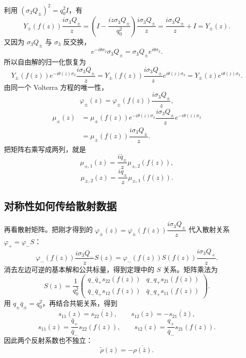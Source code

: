 \documentclass[lang=cn,scheme=chinese,mode=simple,device=normal,color=blue,math=cm,thmcnt=section,12pt]{elegantbook}
\newcommand{\eqq}[2]{\tag{#1}\label{eq:#1}#2}
\begin{document}
利用 $(\sigma_3Q_\pm)^2=q_0^2I$，有
\[
Y_\pm(f(z))\dfrac{i\sigma_3Q_\pm}{z}
=\left(I-\dfrac{iz\sigma_3Q_\pm}{q_0^2}\right)
\dfrac{i\sigma_3Q_\pm}{z}
=\dfrac{i\sigma_3Q_\pm}{z}+I=Y_\pm(z).
\]
又因为 $\sigma_3Q_\pm$ 与 $\sigma_3$ 反交换，
\[
e^{-i\theta\sigma_3}\sigma_3Q_\pm=\sigma_3Q_\pm e^{i\theta\sigma_3}.
\]
所以自由解的归一化恢复为
\[
Y_\pm(f(z))e^{-i\theta(z)\sigma_3}\dfrac{i\sigma_3Q_\pm}{z}
=Y_\pm(f(z))\dfrac{i\sigma_3Q_\pm}{z}e^{i\theta(z)\sigma_3}
=Y_\pm(z)e^{i\theta(z)\sigma_3}.
\]
由同一个 Volterra 方程的唯一性，
\[
\varphi_\pm(z)=\varphi_\pm(f(z))\dfrac{i\sigma_3Q_\pm}{z},
\]
\[
\begin{aligned}
\mu_\pm(z)
&=\mu_\pm(f(z))e^{-i\theta(z)\sigma_3}
\dfrac{i\sigma_3Q_\pm}{z}e^{-i\theta(z)\sigma_3}\\
&=\mu_\pm(f(z))\dfrac{i\sigma_3Q_\pm}{z}.
\end{aligned}
\]
把矩阵右乘写成两列，就是
\begin{equation}\eqq{6.4.37}{\mu_{\pm,1}(z)
=\dfrac{i\bar q_\pm}{z}\mu_{\pm,2}(f(z)),}\end{equation}
\begin{equation}\eqq{6.4.38}{\mu_{\pm,2}(z)
=\dfrac{iq_\pm}{z}\mu_{\pm,1}(f(z)).}\end{equation}

\subsection*{对称性如何传给散射数据}
再看散射矩阵。把刚才得到的 $\varphi_\pm(z)=\varphi_\pm(f(z))\dfrac{i\sigma_3Q_\pm}{z}$ 代入散射关系 $\varphi_+=\varphi_-S$：
\[
\varphi_-(f(z))\dfrac{i\sigma_3Q_-}{z}S(z)
=\varphi_-(f(z))S(f(z))\dfrac{i\sigma_3Q_+}{z}.
\]
消去左边可逆的基本解和公共标量，得到定理中的 $S$ 关系。矩阵乘法为
\[
S(z)=\dfrac{1}{q_0^2}
\begin{pmatrix}
q_-\bar q_+s_{22}(f(z))&q_-q_+s_{21}(f(z))\\
\bar q_-\bar q_+s_{12}(f(z))&\bar q_-q_+s_{11}(f(z))
\end{pmatrix}.
\]
用 $q_\pm\bar q_\pm=q_0^2$，再结合共轭关系，得到
\begin{equation}\eqq{6.4.39}{s_{11}(z)=\overline{s_{22}(\bar z)},\qquad
s_{12}(z)=-\overline{s_{21}(\bar z)},}\end{equation}
\begin{equation}\eqq{6.4.40}{s_{11}(z)=\dfrac{\bar q_+}{\bar q_-}s_{22}(f(z)),
\qquad s_{12}(z)=\dfrac{q_+}{\bar q_-}s_{21}(f(z)).}\end{equation}
因此两个反射系数也不独立：
\[
\widetilde\rho(z)=-\overline{\rho(\bar z)}.
\]
\end{document}
